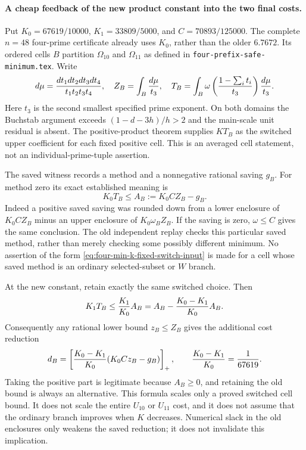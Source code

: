 \paragraph{A cheap feedback of the new product constant into the two final costs.}
Put $K_0=67619/10000$, $K_1=33809/5000$, and
$C=70893/125000$.  The complete $n=48$ four-prime certificate already uses
$K_0$, rather than the older $6.7672$.  Its ordered cells $B$ partition
$\Omega_{10}$ and $\Omega_{11}$ as defined in
\texttt{four-prefix-safe-minimum.tex}.  Write
\[
 d\mu={dt_1dt_2dt_3dt_4\over t_1t_2t_3t_4},\quad
 Z_B=\int_B{d\mu\over t_3},\quad
 T_B=\int_B\omega\left({1-\sum_i t_i\over t_3}\right){d\mu\over t_3}.
\]
Here $t_3$ is the second smallest specified prime exponent.  On both
domains the Buchstab argument exceeds $(1-d-3h)/h>2$ and the main-scale
unit residual is absent.  The positive-product theorem supplies $K T_B$
as the switched upper coefficient for each fixed positive cell.  This
is an averaged cell statement, not an individual-prime-tuple assertion.

The saved witness records a method and a nonnegative rational saving
$g_B$.  For method zero its exact established meaning is
\begin{equation}\label{eq:four-min-k-fixed-switch-input}
 K_0T_B\le A_B:=K_0 C Z_B-g_B.
\end{equation}
Indeed a positive saved saving was rounded down from a lower enclosure
of $K_0 C Z_B$ minus an upper enclosure of $K_0\omega_B Z_B$.
If the saving is zero, $\omega\le C$ gives the same conclusion.
The old independent replay checks this particular saved method, rather
than merely checking some possibly different minimum.  No assertion of
the form \eqref{eq:four-min-k-fixed-switch-input} is made for a cell
whose saved method is an ordinary selected-subset or $W$ branch.

At the new constant, retain exactly the same switched choice.  Then
\[
 K_1T_B\le{K_1\over K_0}A_B
 =A_B-{K_0-K_1\over K_0}A_B.
\]
Consequently any rational lower bound $z_B\le Z_B$ gives the additional
cost reduction
\begin{equation}\label{eq:four-min-k-cheap-saving}
 d_B=\left[{K_0-K_1\over K_0}
                   (K_0 C z_B-g_B)\right]_+,
 \qquad {K_0-K_1\over K_0}={1\over67619}.
\end{equation}
Taking the positive part is legitimate because $A_B\ge0$, and retaining
the old bound is always an alternative.  This formula scales only a
proved switched cell bound.  It does not scale the entire $U_{10}$ or
$U_{11}$ cost, and it does not assume that the ordinary branch improves
when $K$ decreases.  Numerical slack in the old enclosures only weakens
the saved reduction; it does not invalidate this implication.

